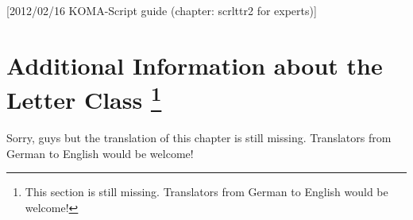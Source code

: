 %
%
%
%
%
%
%
%
% 
%
%
%
%

[2012/02/16 KOMA-Script guide (chapter:
scrlttr2 for experts)]


\chapter{Additional Information about the Letter Class
  \protect\footnote{This section is still missing. Translators from German to English would be welcome! }}

Sorry, guys but the translation of this chapter is still missing. Translators
from German to English would be welcome!

